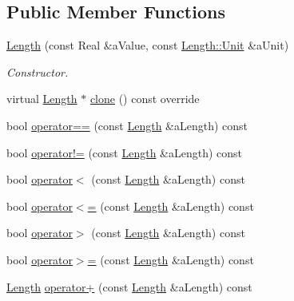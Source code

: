 \subsection*{Public Member Functions}
\begin{DoxyCompactItemize}
\item 
\hyperlink{classlibrary_1_1physics_1_1units_1_1_length_a37acb2579b889c48c526be57208187c6}{Length} (const Real \&a\+Value, const \hyperlink{classlibrary_1_1physics_1_1units_1_1_length_a3b8b39cd245cf6b19dc34459baeccb18}{Length\+::\+Unit} \&a\+Unit)
\begin{DoxyCompactList}\small\item\em Constructor. \end{DoxyCompactList}\item 
virtual \hyperlink{classlibrary_1_1physics_1_1units_1_1_length}{Length} $\ast$ \hyperlink{classlibrary_1_1physics_1_1units_1_1_length_ae06162cf9f3d140a3b53e156a4cb3309}{clone} () const override
\item 
bool \hyperlink{classlibrary_1_1physics_1_1units_1_1_length_a28603b499e587fbb266b214aa8e69b2b}{operator==} (const \hyperlink{classlibrary_1_1physics_1_1units_1_1_length}{Length} \&a\+Length) const
\item 
bool \hyperlink{classlibrary_1_1physics_1_1units_1_1_length_ac2c8c35dcfe12ef8950f99f38d923549}{operator!=} (const \hyperlink{classlibrary_1_1physics_1_1units_1_1_length}{Length} \&a\+Length) const
\item 
bool \hyperlink{classlibrary_1_1physics_1_1units_1_1_length_a670a10bebe9e59df7a0d69dbd911ec45}{operator$<$} (const \hyperlink{classlibrary_1_1physics_1_1units_1_1_length}{Length} \&a\+Length) const
\item 
bool \hyperlink{classlibrary_1_1physics_1_1units_1_1_length_a9a12229f143bcec6cfc57e673ee06d5d}{operator$<$=} (const \hyperlink{classlibrary_1_1physics_1_1units_1_1_length}{Length} \&a\+Length) const
\item 
bool \hyperlink{classlibrary_1_1physics_1_1units_1_1_length_a3fb1ddeb86d64b76147d725f6ce219bf}{operator$>$} (const \hyperlink{classlibrary_1_1physics_1_1units_1_1_length}{Length} \&a\+Length) const
\item 
bool \hyperlink{classlibrary_1_1physics_1_1units_1_1_length_ab91577410faa28d0f05bbd576cc68ae8}{operator$>$=} (const \hyperlink{classlibrary_1_1physics_1_1units_1_1_length}{Length} \&a\+Length) const
\item 
\hyperlink{classlibrary_1_1physics_1_1units_1_1_length}{Length} \hyperlink{classlibrary_1_1physics_1_1units_1_1_length_a511e4f9965dc83b505e4339479cd0d4b}{operator+} (const \hyperlink{classlibrary_1_1physics_1_1units_1_1_length}{Length} \&a\+Length) const

\end{DoxyCompactItemize}
